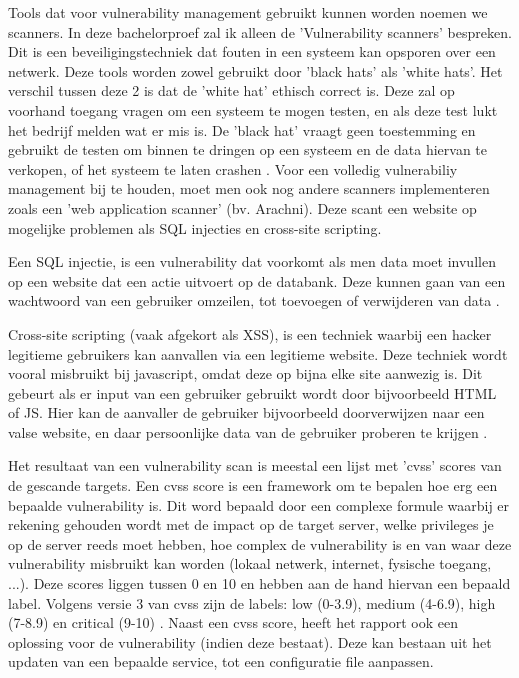 Tools dat voor vulnerability management gebruikt kunnen worden noemen we scanners. In deze bachelorproef zal ik alleen de 'Vulnerability scanners' bespreken. Dit is een beveiligingstechniek  dat fouten in een systeem kan opsporen \textcite{Techopedia} over een netwerk. Deze tools worden zowel gebruikt door 'black hats' als 'white hats'. Het verschil tussen deze 2 is dat de 'white hat' ethisch correct is. Deze zal op voorhand toegang vragen om een systeem te mogen testen, en als deze test lukt het bedrijf melden wat er mis is. De 'black hat' vraagt geen toestemming en gebruikt de testen om binnen te dringen op een systeem en de data hiervan te verkopen, of het systeem te laten crashen \textcite{Howtogeek}. Voor een volledig vulnerabiliy management bij te houden, moet men ook nog andere scanners implementeren zoals een 'web application scanner' (bv. Arachni). Deze scant een website op mogelijke problemen als SQL injecties en cross-site scripting. 

Een SQL injectie, is een vulnerability dat voorkomt als men data moet invullen op een website dat een actie uitvoert op de databank. Deze kunnen gaan van een wachtwoord van een gebruiker omzeilen, tot toevoegen of verwijderen van data \textcite{acunetix}.

Cross-site scripting (vaak afgekort als XSS), is een techniek waarbij een hacker legitieme gebruikers kan aanvallen via een legitieme website. Deze techniek wordt vooral misbruikt bij javascript, omdat deze op bijna elke site aanwezig is. Dit gebeurt als er input van een gebruiker gebruikt wordt door bijvoorbeeld HTML of JS. Hier kan de aanvaller de gebruiker bijvoorbeeld doorverwijzen naar een valse website, en daar persoonlijke data van de gebruiker proberen te krijgen \textcite{acunetix-xss}.

Het resultaat van een vulnerability scan is meestal een lijst met 'cvss' scores van de gescande targets. Een cvss score is een framework om te bepalen hoe erg een bepaalde vulnerability is. Dit word bepaald door een complexe formule waarbij er rekening gehouden wordt met de impact op de target server, welke privileges je op de server reeds moet hebben, hoe complex de vulnerability is en van waar deze vulnerability misbruikt kan worden (lokaal netwerk, internet, fysische toegang, ...). Deze scores liggen tussen 0 en 10 en hebben aan de hand hiervan een bepaald label. Volgens versie 3 van cvss zijn de labels: low (0-3.9), medium (4-6.9), high (7-8.9) en critical (9-10) \textcite{Nist}. Naast een cvss score, heeft het rapport ook een oplossing voor de vulnerability (indien deze bestaat). Deze kan bestaan uit het updaten van een bepaalde service, tot een configuratie file aanpassen.

